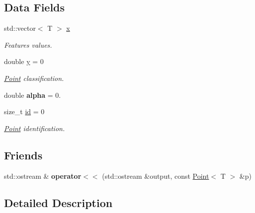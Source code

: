 \subsection*{Data Fields}
\begin{DoxyCompactItemize}
\item 
\mbox{\label{class_point_a8b8cc26f89935fdc83ed464c053c0476}} 
std\+::vector$<$ T $>$ \hyperlink{class_point_a8b8cc26f89935fdc83ed464c053c0476}{x}
\begin{DoxyCompactList}\small\item\em Features values. \end{DoxyCompactList}\item 
\mbox{\label{class_point_abd1a56102bc430eb08fc37dac9aa4c0b}} 
double \hyperlink{class_point_abd1a56102bc430eb08fc37dac9aa4c0b}{y} = 0
\begin{DoxyCompactList}\small\item\em \hyperlink{class_point}{Point} classification. \end{DoxyCompactList}\item 
\mbox{\label{class_point_aa852a1c045d196abd841a6e1e87c27d8}} 
double {\bfseries alpha} = 0.
\item 
\mbox{\label{class_point_af7d6dfc3296421e9f10311d29720aa3b}} 
size\+\_\+t \hyperlink{class_point_af7d6dfc3296421e9f10311d29720aa3b}{id} = 0
\begin{DoxyCompactList}\small\item\em \hyperlink{class_point}{Point} identification. \end{DoxyCompactList}\end{DoxyCompactItemize}
\subsection*{Friends}
\begin{DoxyCompactItemize}
\item 
\mbox{\label{class_point_ae01781a3264312efb15b109d37fceb38}} 
std\+::ostream \& {\bfseries operator$<$$<$} (std\+::ostream \&output, const \hyperlink{class_point}{Point}$<$ T $>$ \&p)
\end{DoxyCompactItemize}


\subsection{Detailed Description}
